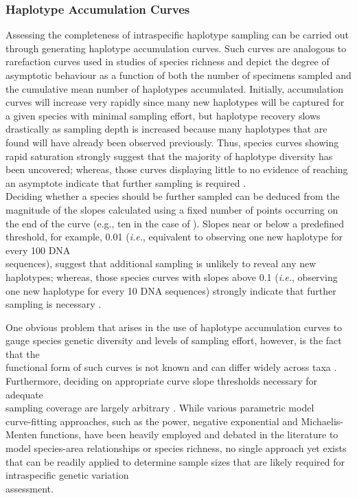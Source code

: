 \subsubsection{Haplotype Accumulation Curves}

Assessing the completeness of intraspecific haplotype sampling can be carried out through generating haplotype accumulation curves. Such curves are analogous to \\ rarefaction curves used in studies of species richness \cite{gotelli2001quantifying} and depict the degree of \\ asymptotic behaviour as a function of both the number of specimens sampled and the cumulative mean number of haplotypes accumulated. Initially, accumulation curves will increase very rapidly since many new haplotypes will be captured for a given species with minimal sampling effort, but haplotype recovery slows drastically as sampling depth is increased because many haplotypes that are found will have already been observed previously. Thus, species curves showing rapid saturation strongly suggest that the majority of haplotype diversity has been uncovered; whereas, those curves displaying little to no evidence of reaching an asymptote indicate that further sampling is required \cite{zhang2010estimating}. \\ Deciding whether a species should be further sampled can be deduced from the magnitude of the slopes calculated using a fixed number of points occurring on the end of the curve (e.g., ten in the case of \cite{phillips2015exploration, young2012revealing}). Slopes near or below a predefined threshold, for example, 0.01 (\textit{i.e.}, equivalent to observing one new haplotype for every 100 DNA \\ sequences), suggest that additional sampling is unlikely to reveal any  new haplotypes; whereas, those species curves with slopes above 0.1 (\textit{i.e.}, observing one new haplotype for every 10 DNA sequences) strongly indicate that further sampling is necessary \cite{hortal2005ed}. 



One obvious problem that arises in the use of haplotype accumulation curves to gauge species genetic diversity and levels of sampling effort, however, is the fact that the \\ functional form of such curves is not known and can differ widely across taxa \cite{phillips2015exploration}. \\ Furthermore, deciding on appropriate curve slope thresholds necessary for adequate \\ sampling coverage are largely arbitrary \cite{hortal2005ed}. While various parametric model \\ curve-fitting approaches, such as the power, negative exponential and Michaelis-Menten functions, have been heavily employed and debated in the literature to model species-area relationships \cite{dengler2009function, tjorve2003shapes} or species richness, no single approach yet exists that can be readily applied to determine sample sizes that are likely required for intraspecific genetic variation \\ assessment.



